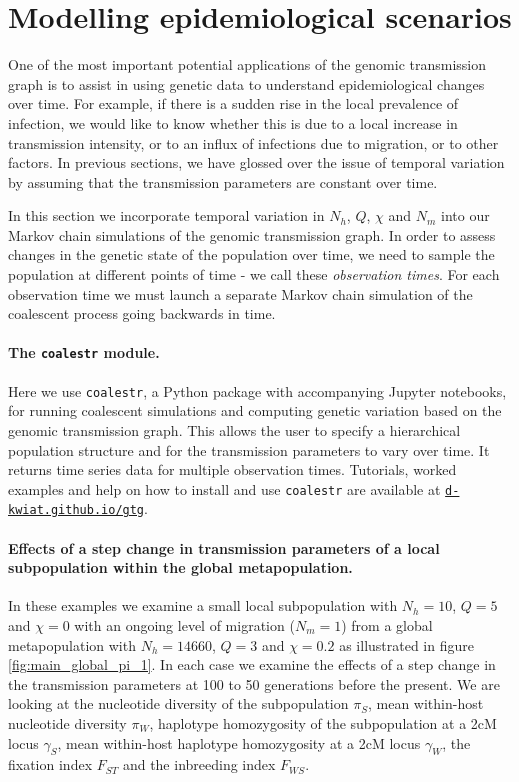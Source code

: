 \documentclass[_main.tex]{subfiles}
\begin{document}
\section*{Modelling epidemiological scenarios}

One of the most important potential applications of the genomic transmission graph is to assist in using genetic data to understand epidemiological changes over time.  For example, if there is a sudden rise in the local prevalence of infection, we would like to know whether this is due to a local increase in transmission intensity, or to an influx of infections due to migration, or to other factors.  In previous sections, we have glossed over the issue of temporal variation by assuming that the transmission parameters are constant over time.

In this section we incorporate temporal variation in $N_h$, $Q$, $\chi$ and $N_m$ into our Markov chain simulations of the genomic transmission graph.   In order to assess changes in the genetic state of the population over time, we need to sample the population at different points of time - we call these \textit{observation times}.  For each observation time we must launch a separate Markov chain simulation of the coalescent process going backwards in time.  

\paragraph{The \texttt{coalestr} module.}  Here we use \texttt{coalestr}, a Python package with accompanying Jupyter notebooks, for running coalescent simulations and computing genetic variation based on the genomic transmission graph.  This allows the user to specify a hierarchical population structure and for the transmission parameters to vary over time.  It returns time series data for multiple observation times.  Tutorials, worked examples and help on how to install and use \texttt{coalestr} are available at \href{https://d-kwiat.github.io/gtg}{\texttt{d-kwiat.github.io/gtg}}. 


\paragraph{Effects of a step change in transmission parameters of a local subpopulation within the global metapopulation.}  In these examples we examine a small local subpopulation with $N_h = 10$, $Q = 5$ and $\chi = 0$ with an ongoing level of migration ($N_m = 1$) from a global metapopulation with $N_h = 14660$, $Q = 3$ and $\chi = 0.2$ as illustrated in figure \ref{fig:main_global_pi_1}.  In each case we examine the effects of a step change in the transmission parameters at 100 to 50 generations before the present.   We are looking at the nucleotide diversity of the subpopulation $\pi_S$, mean within-host nucleotide diversity $\pi_W$, haplotype homozygosity of the subpopulation at a 2cM locus $\gamma_S$, mean within-host haplotype homozygosity at a 2cM locus $\gamma_W$, the fixation index $F_{ST}$ and the inbreeding index $F_{WS}$.
\end{document}

